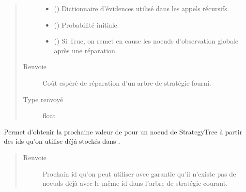 \documentclass[letterpaper,10pt,french]{sphinxmanual}
\begin{document}
\begin{fulllineitems}
\begin{fulllineitems}
\begin{quote}
\begin{description}
\begin{itemize}
\item {} 
 (\sphinxstyleliteralemphasis{\sphinxupquote{(}}\sphinxstyleliteralemphasis{\sphinxupquote{)}}\sphinxstyleliteralemphasis{\sphinxupquote{, }}) \textendash{} Dictionnaire d’évidences utilisé dans les appels récursifs.

\item {} 
 (\sphinxstyleliteralemphasis{\sphinxupquote{, }}) \textendash{} Probabilité initiale.

\item {} 
 (\sphinxstyleliteralemphasis{\sphinxupquote{, }}) \textendash{} Si True, on remet en cause les noeuds d’observation globale après
une réparation.

\end{itemize}

\item[{Renvoie}] \leavevmode
{} \textendash{} Coût espéré de réparation d’un arbre de stratégie fourni.

\item[{Type renvoyé}] \leavevmode
float

\end{description}\end{quote}

\end{fulllineitems}


\begin{fulllineitems}
\label{\detokenize{index:DecisionTheoreticTroubleshooting.TroubleShootingProblem._next_node_id}}
Permet d’obtenir la prochaine valeur de  pour un noeud de
StrategyTree à partir des ids qu’on utilise déjà stockés dans
.
\begin{quote}\begin{description}
\item[{Renvoie}] \leavevmode
{} \textendash{} Prochain id qu’on peut utiliser avec garantie qu’il n’existe pas de
noeuds déjà avec le même id dans l’arbre de stratégie courant.


\end{description}
\end{quote}
\end{fulllineitems}
\end{fulllineitems}
\end{document}
